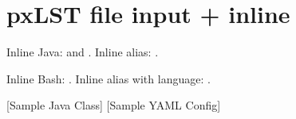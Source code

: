 \documentclass{article}
\begin{document}
\section*{pxLST file input + inline}

Inline Java:  and .
Inline alias: .

Inline Bash: .
Inline alias with language: .

\bigskip

[Sample Java Class]
[Sample YAML Config]
\end{document}
